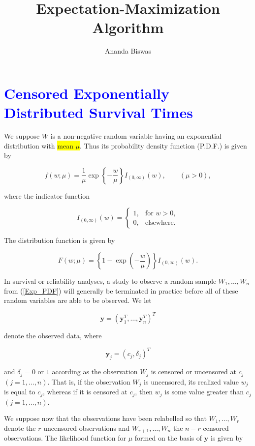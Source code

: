\documentclass[11pt, a4paper]{article}
\title{Expectation-Maximization Algorithm}
\author{{\fontsize{25}{20} \benyorithafont Ananda Biswas}}
\date{}
\begin{document}
\maketitle

\section*{\faArrowAltCircleRight[regular] \textcolor{blue}{Censored Exponentially Distributed Survival Times}}

We suppose $W$ is a non-negative random variable having an exponential
distribution with \colorbox{yellow}{mean $\mu$}. Thus its probability density function
(P.D.F.) is given by

\begin{equation} \label{Exp_PDF}
f(w;\mu) = \dfrac{1}{\mu} \exp\!\left\{-\dfrac{w}{\mu}\right\} I_{(0,\infty)}(w), \qquad (\mu>0),
\end{equation}

where the indicator function

\[
I_{(0,\infty)}(w)
=
\begin{cases}
1, & \text{for } w>0,\\
0, & \text{elsewhere.}
\end{cases}
\]

The distribution function is given by

\[
F(w;\mu)
=
\left\{
1-\exp\!\left(-\dfrac{w}{\mu}\right)
\right\}
I_{(0,\infty)}(w).
\]

In survival or reliability analyses, a study to observe a random sample
$W_1,\ldots,W_n$ from (\ref{Exp_PDF}) will generally be terminated in practice before all of these random variables are able to be observed. We let

\[
\boldsymbol{y}
=
\left(
\boldsymbol{y}_1^{{T}},
\ldots,
\boldsymbol{y}_n^{{T}}
\right)^{{T}}
\]

denote the observed data, where

\[
\boldsymbol{y}_j
=
(c_j,\delta_j)^{{T}}
\]

and $\delta_j = 0$ or $1$ according as the observation $W_j$ is censored
or uncensored at $c_j$ $(j=1,\ldots,n)$. That is, if the observation
$W_j$ is uncensored, its realized value $w_j$ is equal to
$c_j$, whereas if it is censored at $c_j$, then $w_j$ is some value
greater than $c_j$ $(j=1,\ldots,n)$.

We suppose now that the observations have been relabelled so that
$W_1,\ldots,W_r$ denote the $r$ uncensored observations and
$W_{r+1},\ldots,W_n$ the $n-r$ censored observations. The likelihood function for $\mu$ formed on the basis of $\boldsymbol{y}$ is given by
\end{document}
